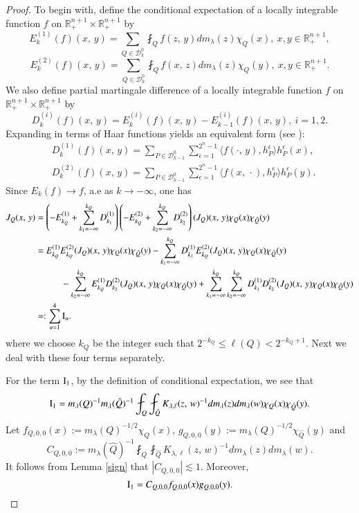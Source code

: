 \documentclass[12pt]{amsart}
\begin{document}
\begin{proof}
To begin with, define the conditional expectation of a locally integrable function $f$ on $\mathbb{R}_+^{n+1}\times \mathbb{R}_+^{n+1}$ by
$$E_{k}^{(1)}(f)(x,\,y)=\sum_{Q\in \mathcal{D}_{k}^0}\fint_{Q}f(z,\,y)dm_\lambda(z)\chi_{Q}(x),\ x,y\in \mathbb{R}_+^{n+1},$$
$$E_{k}^{(2)}(f)(x,\,y)=\sum_{Q\in \mathcal{D}_{k}^0}\fint_{Q}f(x,\,z)dm_\lambda(z)\chi_{Q}(y),\ x,y\in \mathbb{R}_+^{n+1}.$$
We also define partial martingale difference of a locally integrable function $f$ on $\mathbb{R}_+^{n+1}\times \mathbb{R}_+^{n+1}$ by
$$D_{k}^{(i)}(f)(x,\,y)=E_{k}^{(i)}(f)(x,\,y)-E_{k-1}^{(i)}(f)(x,\,y),\ i=1,2.$$
Expanding in terms of Haar functions yields an equivalent form (see \cite{KLPW}):
\begin{align}
&D_{k}^{(1)}(f)(x,\,y)=\sum_{P\in\mathcal{D}^0_{k-1}}\sum_{\epsilon=1}^{2^n-1}\langle f(\cdot,\,y), h_P^\epsilon\rangle h_P^\epsilon(x),\label{dkdef}\\
&D_{k}^{(2)}(f)(x,\,y)=\sum_{P\in\mathcal{D}^0_{k-1}}\sum_{\epsilon=1}^{2^n-1}\langle f(x,\,\cdot), h_P^\epsilon\rangle h_P^\epsilon(y).\label{dkdef2}
\end{align}
Since $E_k(f)\rightarrow f$, a.e as $k\rightarrow -\infty$, one has
\begin{align}
J_{Q}(x,\,y)&=\left(-E_{k_Q}^{(1)}+\sum_{k_1=-\infty}^{k_Q}D_{k_1}^{(1)}\right)\left(-E_{k_Q}^{(2)}+\sum_{k_2=-\infty}^{k_Q}D_{k_2}^{(2)}\right)(J_Q)(x,\,y)\chi_Q(x)\chi_{\hat{Q}}(y)\nonumber\\
&=E_{k_Q}^{(1)}E_{k_Q}^{(2)}(J_Q)(x,\,y)\chi_Q(x)\chi_{\hat{Q}}(y)-\sum_{k_1=-\infty}^{k_Q}D_{k_1}^{(1)}E_{k_Q}^{(2)}(J_Q)(x,\,y)\chi_Q(x)\chi_{\hat{Q}}(y)\nonumber\\
&\hspace{1.0cm}-\sum_{k_2=-\infty}^{k_Q}E_{k_Q}^{(1)}D_{k_2}^{(2)}(J_Q)(x,\,y)\chi_Q(x)\chi_{\hat{Q}}(y)+\sum_{k_1=-\infty}^{k_Q}\sum_{k_2=-\infty}^{k_Q}D_{k_1}^{(1)}D_{k_2}^{(2)}(J_Q)(x,\,y)\chi_Q(x)\chi_{\hat{Q}}(y)\nonumber\\
&=:\sum_{u=1}^4{\rm I}_u.
\end{align}
where we choose $k_Q$ be the integer such that $2^{-k_Q}\leq \ell(Q)<2^{-k_Q+1}$. Next we deal with these four terms separately.

For the term ${\rm I}_1$, by the definition of conditional expectation, we see that
$${\rm I}_1=m_\lambda(Q)^{-1}m_\lambda(\hat{Q})^{-1}\fint_Q\fint_{\hat{Q}}K_{\lambda,\ell}(z,\,w)^{-1}dm_\lambda(z)dm_\lambda(w)\chi_Q(x)\chi_{\hat{Q}}(y).$$
Let $f_{Q,0,0}(x):=m_\lambda(Q)^{-1/2}\chi_Q(x)$, $g_{Q,0,0}(y):=m_\lambda(Q)^{-1/2}\chi_{\hat{Q}}(y)$ and $$C_{Q,0,0}:=m_\lambda(\hat{Q})^{-1}\fint_Q\fint_{\hat{Q}}K_{\lambda,\ell}(z,\,w)^{-1}dm_\lambda(z)dm_\lambda(w).$$
 It follows from Lemma \ref{sign} that
$
|C_{Q,0,0}|\lesssim 1.
$
Moreover, $${\rm I}_1=C_{Q,0,0}f_{Q,0,0}(x)g_{Q,0,0}(y).$$


\end{proof}
\end{document}
